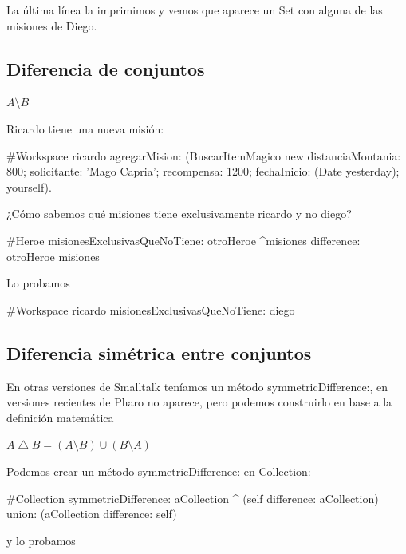 \documentclass[a4paper,12pt]{book}
\begin{document}
La última línea la imprimimos y vemos que aparece un Set con alguna de las misiones de Diego.

\subsection{Diferencia de conjuntos}

\begin{mdframed}[style=BoxFrame]
\( A \setminus B \)
\end{mdframed}

Ricardo tiene una nueva misión:

\begin{code}
#Workspace
 ricardo agregarMision: (BuscarItemMagico new 
			distanciaMontania: 800;
			solicitante: 'Mago Capria';
			recompensa: 1200;
			fechaInicio: (Date yesterday);
			yourself).
\end{code}

¿Cómo sabemos qué misiones tiene exclusivamente ricardo y no diego?

\begin{code}
#Heroe
misionesExclusivasQueNoTiene: otroHeroe
    ^misiones difference: otroHeroe misiones
\end{code}

Lo probamos

\begin{code}
#Workspace
ricardo misionesExclusivasQueNoTiene: diego
\end{code}

\subsection{Diferencia simétrica entre conjuntos}
En otras versiones de Smalltalk teníamos un método symmetricDifference:, en versiones recientes de Pharo
no aparece, pero podemos construirlo en base a la definición matemática 

\begin{mdframed}[style=BoxFrame]
\( A \bigtriangleup B = (A \setminus B) \cup (B \setminus A) \) 
\end{mdframed}

Podemos crear un método symmetricDifference: en Collection:

\begin{code}
#Collection
symmetricDifference: aCollection
	^ (self difference: aCollection) 
	     union: (aCollection difference: self)
\end{code}

y lo probamos
\end{document}
